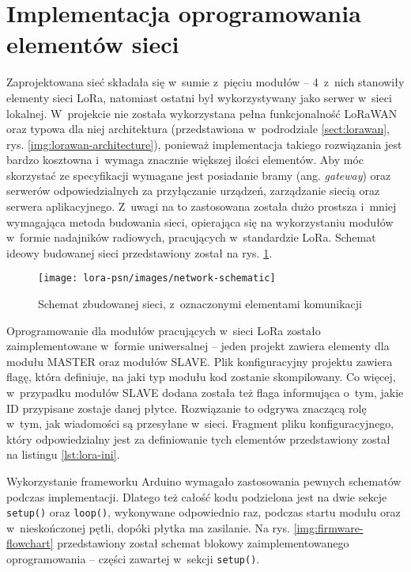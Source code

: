 \FloatBarrier
\section{Implementacja oprogramowania elementów sieci\label{sect:firmware-network}} Zaprojektowana sieć składała się
w~sumie z~pięciu modułów -- 4~z~nich stanowiły elementy sieci LoRa, natomiast ostatni był wykorzystywany jako serwer
w~sieci lokalnej. W~projekcie nie została wykorzystana pełna funkcjonalność LoRaWAN oraz typowa dla niej architektura
(przedstawiona w~podrodziale \ref{sect:lorawan}, rys. \ref{img:lorawan-architecture}), ponieważ implementacja takiego
rozwiązania jest bardzo kosztowna i~wymaga znacznie większej ilości elementów. Aby móc skorzystać ze specyfikacji
wymagane jest posiadanie bramy (ang. \textsl{gateway}) oraz serwerów odpowiedzialnych za przyłączanie urządzeń,
zarządzanie siecią oraz serwera aplikacyjnego. Z~uwagi na to zastosowana została dużo prostsza i~mniej wymagająca metoda
budowania sieci, opierająca się na wykorzystaniu modułów w~formie nadajników radiowych, pracujących w~standardzie LoRa.
Schemat ideowy budowanej sieci przedstawiony został na rys. \ref{img:network-schematic}.

\begin{figure}[!htbp]
    \centering
    \texttt{[image: lora-psn/images/network-schematic]}
    \caption{\label{img:network-schematic}Schemat zbudowanej sieci, z~oznaczonymi elementami komunikacji}
\end{figure}

Oprogramowanie dla modułów pracujących w~sieci LoRa zostało zaimplementowane w~formie uniwersalnej -- jeden projekt
zawiera elementy dla modułu MASTER oraz modułów SLAVE. Plik konfiguracyjny projektu zawiera flagę, która definiuje, na
jaki typ modułu kod zostanie skompilowany. Co więcej, w~przypadku modułów SLAVE dodana została też flaga informująca
o~tym, jakie ID przypisane zostaje danej płytce. Rozwiązanie to odgrywa znaczącą rolę w~tym, jak wiadomości są
przesyłane w~sieci. Fragment pliku konfiguracyjnego, który odpowiedzialny jest za definiowanie tych elementów
przedstawiony został na listingu \ref{lst:lora-ini}.



Wykorzystanie frameworku Arduino wymagało zastosowania pewnych schematów podczas implementacji. Dlatego też całość kodu
podzielona jest na dwie sekcje \texttt{setup()} oraz \texttt{loop()}, wykonywane odpowiednio raz, podczas startu modułu
oraz w~nieskończonej pętli, dopóki płytka ma zasilanie. Na rys. \ref{img:firmware-flowchart} przedstawiony został
schemat blokowy zaimplementowanego oprogramowania -- części zawartej w~sekcji \texttt{setup()}.

